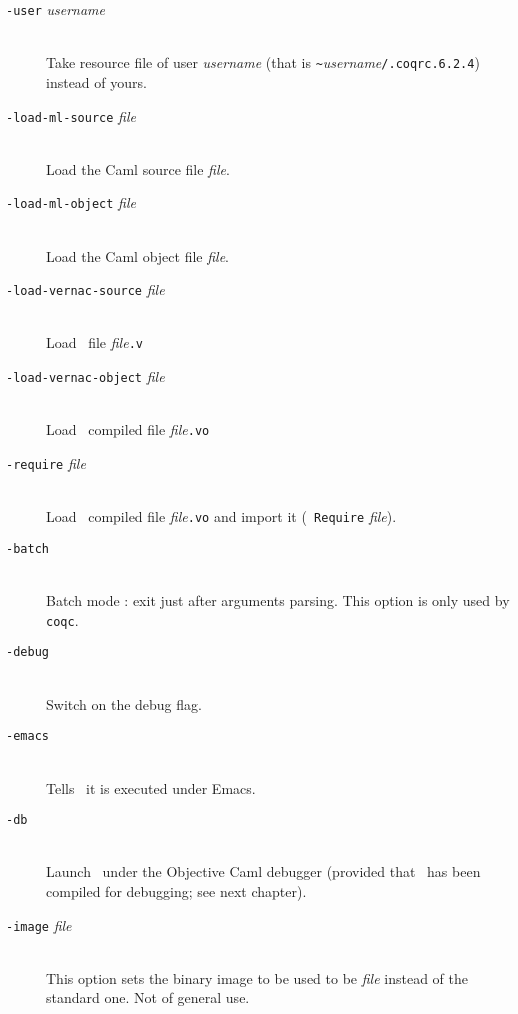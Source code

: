 \begin{description}
\item[{\tt -user} {\em username}]\ \\
  Take resource file of user {\em username} (that is 
  \verb+~+{\em username}{\tt /.coqrc.6.2.4}) instead of yours.

\item[{\tt -load-ml-source} {\em file}]\ \\
  Load the Caml source file {\em file}.

\item[{\tt -load-ml-object} {\em file}]\ \\
  Load the Caml object file {\em file}.

\item[{\tt -load-vernac-source} {\em file}]\ \\
  Load \Coq~file {\em file}{\tt .v}

\item[{\tt -load-vernac-object} {\em file}]\ \\
  Load \Coq~compiled file {\em file}{\tt .vo}

%
\item[{\tt -require} {\em file}]\ \\
  Load \Coq~compiled file {\em file}{\tt .vo} and import it ({\tt
    Require} {\em file}).

\item[{\tt -batch}]\ \\
  Batch mode : exit just after arguments parsing. This option is only
  used by {\tt coqc}.

\item[{\tt -debug}]\ \\
  Switch on the debug flag.

\item[{\tt -emacs}]\ \\
  Tells \Coq\ it is executed under Emacs.

\item[{\tt -db}]\ \\
  Launch \Coq\ under the Objective Caml debugger (provided that \Coq\
  has been compiled for debugging; see next chapter).

\item[{\tt -image} {\em file}]\ \\
  This option sets the binary image to be used to be {\em file}
  instead of the standard one. Not of general use.


\end{description}
